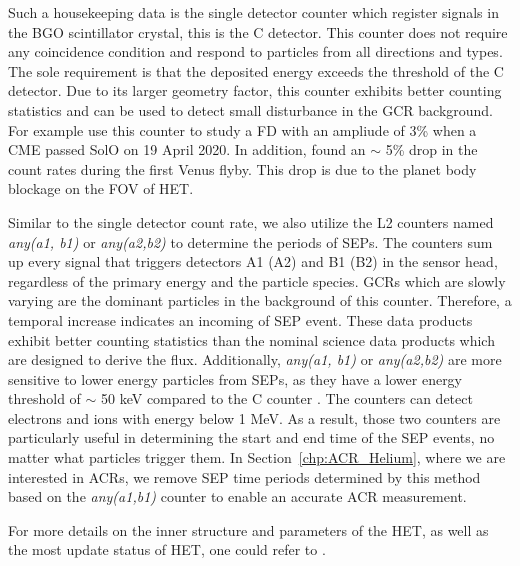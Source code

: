 Such a housekeeping data is the single detector counter which register signals in the \ac{BGO} scintillator crystal, this is the C detector. This counter does not require any coincidence condition and respond to particles from all directions and types. The sole requirement is that the deposited energy exceeds the threshold of the C detector. Due to its larger geometry factor, this counter exhibits better counting statistics and can be used to detect small disturbance in the \ac{GCR} background. For example \citet{Forstner-2021-SolO} use this counter to study a \ac{FD} with an ampliude of 3\% when a \ac{CME} passed \ac{SolO} on 19 April 2020. In addition, \citet{Allen2021AA_venus} found an $\sim$ 5\% drop in the count rates during the first Venus flyby. This drop is due to the planet body blockage on the \ac{FOV} of \ac{HET}.

Similar to the single detector count rate, we also utilize the L2 counters named \textit{any(a1, b1)} or \textit{any(a2,b2)} to determine the periods of \acp{SEP}. The counters sum up every signal that triggers detectors A1 (A2) and B1 (B2) in the sensor head, regardless of the primary energy and the particle species. \acp{GCR} which are slowly varying are the dominant particles in the background of this counter. Therefore, a temporal increase indicates an incoming of \ac{SEP} event. These data products exhibit better counting statistics than the nominal science data products which are designed to derive the flux. Additionally, \textit{any(a1, b1)} or \textit{any(a2,b2)} are more sensitive to lower energy particles from \acp{SEP}, as they have a lower energy threshold of $\sim$ 50 keV compared to the C counter \citep{Elftmann-2020-PhD}. The counters can detect electrons and ions with energy below 1 MeV. As a result, those two counters are particularly useful in determining the start and end time of the \ac{SEP} events, no matter what particles trigger them. In Section~\ref{chp:ACR_Helium}, where we are interested in \acp{ACR}, we remove \ac{SEP} time periods determined by this method based on the \textit{any(a1,b1)} counter to enable an accurate \ac{ACR} measurement.

For more details on the inner structure and parameters of the \ac{HET}, as well as the most update status of \ac{HET}, one could refer to \citet{RodriguezPacheco-2019-EPD, Wimmer2021AA,Elftmann-2020-PhD}.

